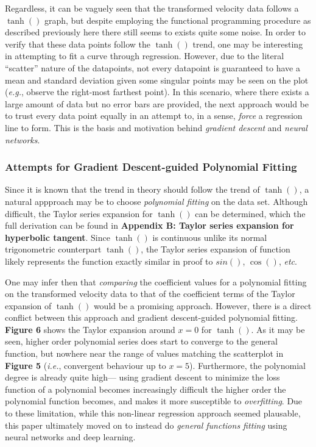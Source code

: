 \documentclass[12pt]{article}
\begin{document}
\begin{multicols}{2}
Regardless, it can be vaguely seen that the transformed velocity data follows a $\tanh()$ graph,
but despite employing the functional programming procedure as described previously here there still seems to exists quite some noise.
In order to verify that these data points follow the $\tanh()$ trend, one may be interesting in attempting to fit a curve through regression.
However, due to the literal ``scatter'' nature of the datapoints, not every datapoint is guaranteed to have a mean and standard deviation given some singular points may be seen on the plot (\textit{e.g.}, observe the right-most farthest point).
In this scenario, where there exists a large amount of data but no error bars are provided,
the next approach would be to trust every data point equally in an attempt to, in a sense, \textit{force} a regression line to form.
This is the basis and motivation behind \textit{gradient descent} and \textit{neural networks}.

\subsubsection{Attempts for Gradient Descent-guided Polynomial Fitting}
Since it is known that the trend in theory should follow the trend of $\tanh()$,
a natural appproach may be to choose \textit{polynomial fitting} on the data set.
Although difficult, the Taylor series expansion for $\tanh()$ can be determined,
which the full derivation can be found in \textbf{Appendix B: Taylor series expansion for hyperbolic tangent}. %
Since $\tanh()$ is continuous unlike its normal trigonometric counterpart $\tanh()$,
the Taylor series expansion of function likely represents the function exactly similar in proof to $sin()$, $\cos()$, \textit{etc}.

One may infer then that \textit{comparing} the coefficient values for a polynomial fitting on the transformed velocity data to that of the coefficient terms of the Taylor expansion of $\tanh()$ would be a promising approach.
However, there is a direct conflict between this approach and gradient descent-guided polynomial fitting.
\textbf{Figure 6} shows the Taylor expansion around $x=0$ for $\tanh()$.
As it may be seen, higher order polynomial series does start to converge to the general function,
but nowhere near the range of values matching the scatterplot in \textbf{Figure 5} (\textit{i.e.}, convergent behaviour up to $x=5$).
Furthermore, the polynomial degree is already quite high---
using gradient descent to minimize the loss function of a polynomial becomes increasingly difficult the higher order the polynomial function becomes,
and makes it more susceptible to \textit{overfitting}.
Due to these limitation, while this non-linear regression approach seemed plausable,
this paper ultimately moved on to instead do \textit{general functions fitting} using neural networks and deep learning.


\end{multicols}
\end{document}
